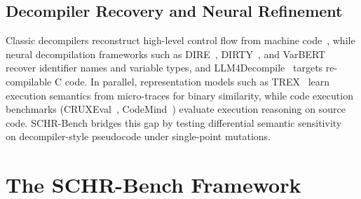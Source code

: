 \documentclass[runningheads]{llncs}
\begin{document}
\subsection{Decompiler Recovery and Neural Refinement}
Classic decompilers reconstruct high-level control flow from machine code~\cite{cifuentes1995decompilation,yakdan2015norepdb,schwarz2002disassembly}, while neural decompilation frameworks such as DIRE~\cite{lacomis2019dire}, DIRTY~\cite{chen2022dirty}, and VarBERT~\cite{pal2024varbert} recover identifier names and variable types, and LLM4Decompile~\cite{tan2024llm4decompile} targets re-compilable C code. In parallel, representation models such as TREX~\cite{pei2021trex} learn execution semantics from micro-traces for binary similarity, while code execution benchmarks (CRUXEval~\cite{gu2024cruxeval}, CodeMind~\cite{liu2024codemind}) evaluate execution reasoning on source code. SCHR-Bench bridges this gap by testing differential semantic sensitivity~\cite{jia2011analysis} on decompiler-style pseudocode under single-point mutations.

\section{The SCHR-Bench Framework}
\end{document}
